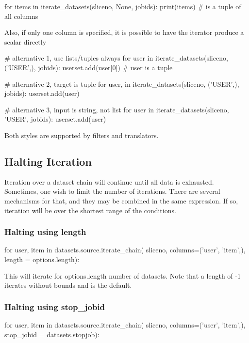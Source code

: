 \begin{python}
for items in iterate_datasets(sliceno, None, jobids):
    print(items)  # is a tuple of all columns
\end{python}
Also, if only one column is specified, it is possible to have the
iterator produce a scalar directly

\begin{python}
# alternative 1, use lists/tuples always
for user in iterate_datasets(sliceno, ('USER',), jobids):
    userset.add(user[0])  # user is a tuple

# alternative 2, target is tuple
for user, in iterate_datasets(sliceno, ('USER',), jobids):
    userset.add(user)

# alternative 3, input is string, not list
for user in iterate_datasets(sliceno, 'USER', jobids):
    userset.add(user)
\end{python}
Both styles are supported by filters and translators.




\subsection{Halting Iteration}

Iteration over a dataset chain will continue until all data is
exhausted.  Sometimes, one wish to limit the number of iterations.
There are several mechanisms for that, and they may be combined in the
same expression.  If so, iteration will be over the shortest range of
the conditions.

\subsubsection*{Halting using length}
\begin{python}
for user, item in datasets.source.iterate_chain(
    sliceno,
    columns=('user', 'item',),
    length = options.length):
\end{python}
This will iterate for options.length number of datasets.  Note that a
length of -1 iterates without bounds and is the default.


\subsubsection*{Halting using stop\_jobid}
\begin{python}
for user, item in datasets.source.iterate_chain(
    sliceno,
    columns=('user', 'item',),
    stop_jobid = datasets.stopjob):
\end{python}

